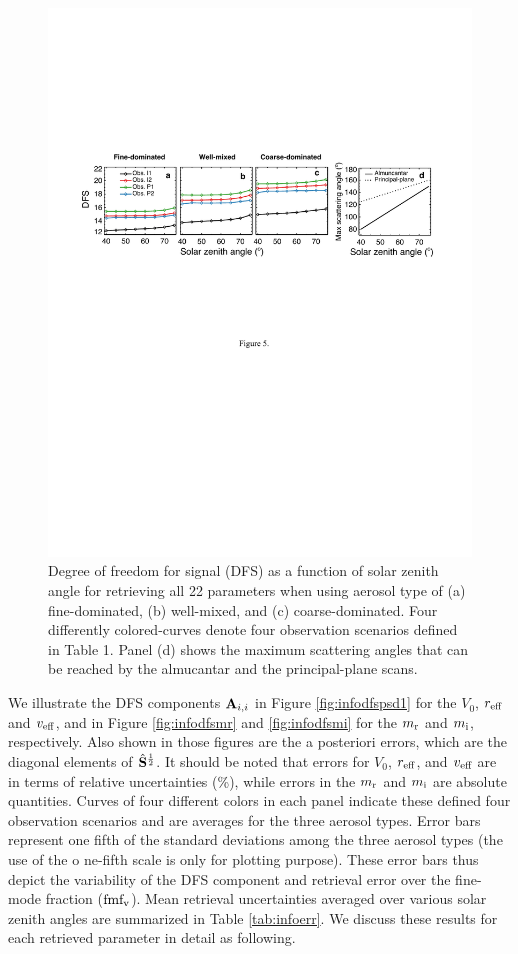 \begin{figure}[t]
  \centering
  \includegraphics[width={\textwidth}]{figures/info05.pdf}
  \caption{Degree of freedom for signal (DFS) as a function of solar zenith
angle for retrieving all 22 parameters when using aerosol type of (a)
fine-dominated,  (b) well-mixed, and (c) coarse-dominated. Four differently
colored-curves denote four observation scenarios defined in Table 1. Panel (d)
shows the maximum scattering angles that can be reached by the almucantar and
the principal-plane scans.}
  \label{fig:infodfs1}
\end{figure}

We illustrate the DFS components $\mathbf{A}_{i,i}$ in Figure \ref{fig:infodfspsd1} 
for the $V_0$, $r_\text{eff}$ and $v_\text{eff}$, and in Figure \ref{fig:infodfsmr} and
\ref{fig:infodfsmi} for the $m_\text{r}$ and $m_\text{i}$, respectively. Also shown
in those figures are the a posteriori errors, which are the diagonal elements
of $\hat{\mathbf{S}}^{\frac{1}{2}}$. It should be noted that errors for $V_0$,
$r_\text{eff}$, and $v_\text{eff}$ are in terms of relative uncertainties (\%), while errors
in the $m_\text{r}$ and $m_\text{i}$ are absolute quantities. Curves of four different
colors in each panel indicate these defined four observation scenarios and
are averages for the three aerosol types. Error bars represent one fifth of 
the standard deviations among the three aerosol types (the use of the o
ne-fifth scale is only for plotting purpose). These error bars thus depict
the variability of the DFS component and retrieval error over the fine-mode 
fraction ($\text{fmf}_\text{v}$). Mean retrieval uncertainties averaged over various solar 
zenith angles are summarized in Table \ref{tab:infoerr}. We discuss these results 
for each retrieved parameter in detail as following. 

